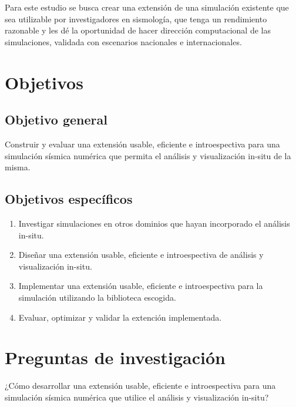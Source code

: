 \documentclass{article}
\begin{document}
Para este estudio se busca crear una extensión de una simulación existente que sea utilizable por investigadores en sismología, que tenga un rendimiento razonable y les dé la oportunidad de hacer dirección computacional de las simulaciones, validada con escenarios nacionales e internacionales.

\section{Objetivos}
\subsection{Objetivo general}
Construir y evaluar una extensión usable, eficiente e introespectiva para una simulación sísmica numérica que permita el análisis y visualización in-situ de la misma. %
\subsection{Objetivos específicos}
\begin{enumerate}
  \item Investigar simulaciones en otros dominios que hayan incorporado el análisis in-situ. %
  \item Diseñar una extensión usable, eficiente e introespectiva de análisis y visualización in-situ.
  \item Implementar una extensión usable, eficiente e introespectiva para la simulación utilizando la biblioteca escogida. %
  \item Evaluar, optimizar y validar la extención implementada. %
\end{enumerate}

\section{Preguntas de investigación}
¿Cómo desarrollar una extensión usable, eficiente e introespectiva para una simulación sísmica numérica que utilice el análisis y visualización in-situ?

\printbibliography
\end{document}
